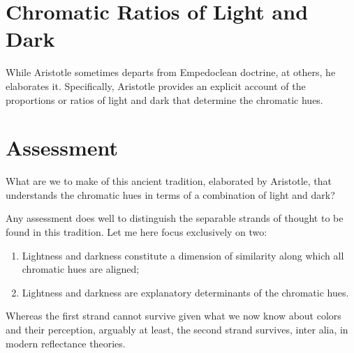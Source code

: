 

\section{Chromatic Ratios of Light and Dark} %
\label{sec:chromatic_ratios_of_light_and_dark}

While Aristotle sometimes departs from Empedoclean doctrine, at others, he elaborates it. Specifically, Aristotle provides an explicit account of the proportions or ratios of light and dark that determine the chromatic hues.


\section{Assessment} %
\label{sec:assessment}

What are we to make of this ancient tradition, elaborated by Aristotle, that understands the chromatic hues in terms of a combination of light and dark?

Any assessment does well to distinguish the separable strands of thought to be found in this tradition. Let me here focus exclusively on two:
\begin{enumerate}[(1)]
	\item Lightness and darkness constitute a dimension of similarity along which all chromatic hues are aligned;
	\item Lightness and darkness are explanatory determinants of the chromatic hues.
\end{enumerate}
Whereas the first strand cannot survive given what we now know about colors and their perception, arguably at least, the second strand survives, inter alia, in modern reflectance theories.

